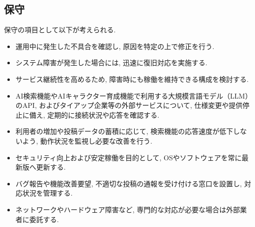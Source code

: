 \subsection{保守}
保守の項目として以下が考えられる.
\begin{itemize}
    \item 運用中に発生した不具合を確認し, 原因を特定の上で修正を行う.

    \item システム障害が発生した場合には, 迅速に復旧対応を実施する.

    \item サービス継続性を高めるため, 障害時にも稼働を維持できる構成を検討する.

    \item AI検索機能やAIキャラクター育成機能で利用する大規模言語モデル（LLM）のAPI, およびタイアップ企業等の外部サービスについて, 仕様変更や提供停止に備え, 定期的に接続状況や応答を確認する.

    \item 利用者の増加や投稿データの蓄積に応じて, 検索機能の応答速度が低下しないよう, 動作状況を監視し必要な改善を行う.

    \item セキュリティ向上および安定稼働を目的として, OSやソフトウェアを常に最新版へ更新する.

    \item バグ報告や機能改善要望, 不適切な投稿の通報を受け付ける窓口を設置し, 対応状況を管理する.

    \item ネットワークやハードウェア障害など, 専門的な対応が必要な場合は外部業者に委託する.
\end{itemize}
